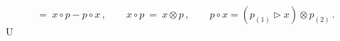 \begin{equation}[x,p] \ = \ x\circ p-p\circ x\, ,
\qquad  x\circ p \ = \ x\otimes p\, , \qquad p\circ
x=(p_{(1)}\triangleright x)\otimes p_{(2)}\,
.\label{r320}\end{equation}U
